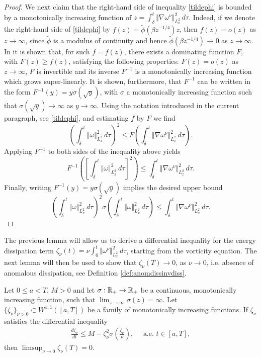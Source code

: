 \documentclass[reqno,12pt]{amsart}
\renewcommand{\tilde}{\widetilde}
\begin{document}
\begin{proof}
  We next claim that the right-hand side of inequality \eqref{tildephi} is bounded by  a monotonically increasing function of $z = \int_\delta^t \Vert \nabla \omega^\nu \Vert^2_{L^2_x} \, d\tau$. Indeed, if we denote the right-hand side of \eqref{tildephi} by $f(z) = \tilde{\phi}(\beta z^{-1/4}) z$, then $f(z) = o(z)$ as $z \to \infty$, since $\tilde{\phi}$ is a modulus of continuity and hence $\tilde{\phi}(\beta z^{-1/4}) \to 0$ as $z\to \infty$. In \cite[Appendix C, Lemma C.1]{LMPP2021a} it is shown that, for such $f=f(z)$, there exists a dominating function $F$, with $F(z) \ge f(z)$, satisfying the following properties: $F(z) = o(z)$ as $z \to \infty$, $F$ is invertible and its inverse $F^{-1}$ is a monotonically increasing function which grows super-linearly. It is shown, furthermore, that $F^{-1}$ can be written in the form $F^{-1}(y) = y\sigma(\sqrt{y}) $, with $\sigma$ a monotonically increasing function such that $\sigma(\sqrt{y}) \to \infty$ as $y\to \infty$. Using the notation introduced in the current paragraph, see \eqref{tildephi}, and estimating $f$ by $F$ we find
      \[
  \left(\int_\delta^t \Vert \omega \Vert_{L^2_x}^2 \, d\tau\right)^2
    \le
  F\left( \int_\delta^t \Vert \nabla \omega^\nu \Vert_{L^2_x}^2 \, d\tau \right).
  \]
Applying $F^{-1}$ to both sides of the inequality above yields
  \[
    F^{-1}\left(\left[\int_\delta^t \Vert \omega \Vert_{L^2_x}^2 \, d\tau\right]^2
    \right)
  \le
  \int_\delta^t \Vert \nabla \omega^\nu \Vert_{L^2_x}^2 \, d\tau.
  \]
  Finally, writing $F^{-1}(y) = y\sigma(\sqrt{y})$  implies the desired upper bound
  \[
  \left(\int_\delta^t \Vert \omega \Vert_{L^2_x}^2 \, d\tau\right)^2
  \sigma\left(\int_\delta^t \Vert \omega \Vert_{L^2_x}^2 \, d\tau\right)
  \le
  \int_\delta^t \Vert \nabla \omega^\nu \Vert_{L^2_x}^2 \, d\tau.
  \]

\end{proof}


The previous lemma will allow us to derive a differential inequality for the energy dissipation term $\zeta_\nu(t) = \nu \int_0^t \Vert \omega^\nu \Vert_{L^2_x}^2 \, d\tau$, starting from the vorticity equation. The next lemma will then be used to show that $\zeta_\nu(T) \to 0$, as $\nu \to 0$, i.e. absence of anomalous dissipation, see Definition \ref{def:anomdissinvdiss}.

\begin{lemma} \label{lem:ide}
Let $0\leq a < T$, $M>0$ and let $\sigma: \mathbb{R}_+ \to \mathbb{R}_+$ be a continuous, monotonically increasing function, such that $\lim_{z\to \infty} \sigma(z) = \infty$. Let $\{\zeta_\nu\}_{\nu>0} \subset W^{1,1}([a,T])$ be a family of monotonically increasing functions. If $\zeta_\nu$ satisfies the differential inequality
\begin{align*}
\frac{d\zeta_\nu}{dt}
\le M - \zeta_\nu^2 \sigma\left(\frac{\zeta_\nu}{\nu}\right), \quad \text{ a.e. } t \in [a,T],
\end{align*}
then $\limsup_{\nu \to 0} \zeta_\nu(T) = 0$.
\end{lemma}
\end{document}
